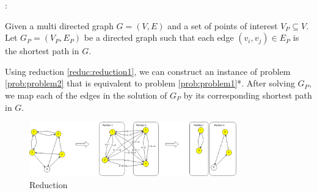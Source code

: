 \begin{reduction}:


Given a multi directed graph $G = (V, E)$ and a set of points of interest $V_P \subseteq V$. Let $G_P = (V_P, E_P)$ be a directed graph such that each edge $(v_i, v_j) \in E_P$ is the shortest path in $G$.

\label{reduc:reduction1}
\end{reduction}

Using reduction \ref{reduc:reduction1}, we can construct an instance of problem \ref{prob:problem2} that is equivalent to problem \ref{prob:problem1}*. After solving $G_P$, we map each of the edges in the solution of $G_P$ by its corresponding shortest path in $G$.

\begin{figure}[h!]
\centering
\includegraphics[width=0.8\textwidth]{assets/reduction.png}
\caption{Reduction}
\label{fig:reduction}
\end{figure}

